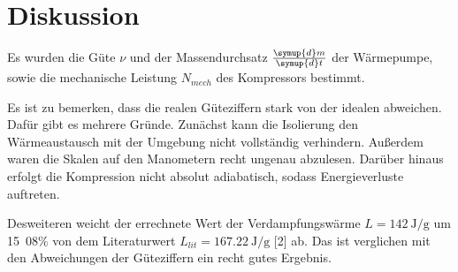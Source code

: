 \section{Diskussion}
\label{sec:Diskussion}

Es wurden die Güte $\nu$ und der Massendurchsatz 
$\frac{\symup{d}m}{\symup{d}t}$ der Wärmepumpe, sowie die 
mechanische Leistung $N_{mech}$ des Kompressors bestimmt. 

Es ist zu bemerken, dass die realen Güteziffern stark 
von der idealen abweichen. Dafür gibt es mehrere Gründe. 
Zunächst kann die Isolierung den Wärmeaustausch mit der 
Umgebung nicht vollständig verhindern. Außerdem waren
die Skalen auf den Manometern recht ungenau abzulesen. 
Darüber hinaus erfolgt die Kompression nicht absolut 
adiabatisch, sodass Energieverluste auftreten. 

Desweiteren weicht der errechnete Wert der Verdampfungswärme
$L = \SI{142}{\joule\per\gram}$ um \si{15.08}\% von dem Literaturwert 
$L_{lit}=\SI{167.22}{\joule\per\gram}$ [2] ab. Das ist 
verglichen mit den Abweichungen der Güteziffern ein recht gutes 
Ergebnis.